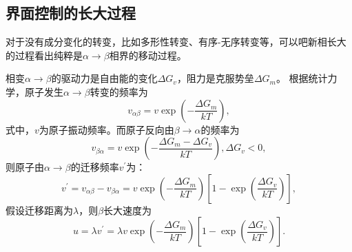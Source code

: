         \subsection{界面控制的长大过程}
            对于没有成分变化的转变，比如多形性转变、有序-无序转变等，可以吧新相长大的过程看出纯粹是$\alpha\to\beta$相界的移动过程。

            相变$\alpha\to\beta$的驱动力是自由能的变化$\Delta G_v$，阻力是克服势垒$\Delta G_m$。
            根据统计力学，原子发生$\alpha\to\beta$转变的频率为
            \begin{equation}
                v_{\alpha \beta}=v \exp \left(-\frac{\Delta G_{m}}{k T}\right),
            \end{equation}
            式中，$v$为原子振动频率。而原子反向由$\beta\to\alpha$的频率为
            \begin{equation}
                v_{\beta \alpha}=v \exp \left(-\frac{\Delta G_{m}-\Delta G_{v}}{k T}\right),\Delta G_{v}<0,
            \end{equation}
            则原子由$\alpha\to\beta$的迁移频率$v^\prime$为：
            \begin{equation}
                v^{\prime}=v_{\alpha \beta}-v_{\beta \alpha}=v \exp \left(-\frac{\Delta G_{m}}{k T}\right)\left[1-\exp \left(\frac{\Delta G_{v}}{k T}\right)\right],
            \end{equation}
            假设迁移距离为$\lambda$，则$\beta$长大速度为
            \begin{equation}
                u=\lambda v^{\prime}=\lambda v \exp \left(-\frac{\Delta G_{m}}{k T}\right)\left[1-\exp \left(\frac{\Delta G_{v}}{k T}\right)\right].
            \end{equation}

